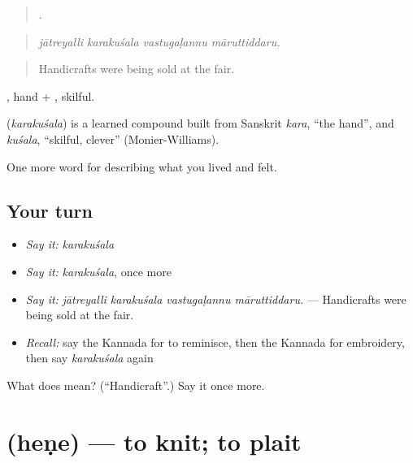 \begin{quote}
   .
\end{quote}

\begin{quote}
\emph{jātreyalli karakuśala vastugaḷannu māruttiddaru.}
\end{quote}

\begin{quote}
Handicrafts were being sold at the fair.
\end{quote}

, hand + , skilful.

\begin{cousinweb}
\textbf{} (\emph{karakuśala}) is a learned compound built from Sanskrit \emph{kara}, \textquotedblleft{}the hand\textquotedblright{}, and \emph{kuśala}, \textquotedblleft{}skilful, clever\textquotedblright{} (Monier-Williams).
\end{cousinweb}

\begin{grammarlens}[title={What you've built}]
One more word for describing what you lived and felt.
\end{grammarlens}

\subsection*{Your turn}
\begin{itemize}
\raggedright
  \item \emph{Say it:} \emph{karakuśala}
  \item \emph{Say it:} \emph{karakuśala}, once more
  \item \emph{Say it:} \emph{jātreyalli karakuśala vastugaḷannu māruttiddaru.} — Handicrafts were being sold at the fair.
  \item \emph{Recall:} say the Kannada for to reminisce, then the Kannada for embroidery, then say \emph{karakuśala} again
\end{itemize}

\begin{tcolorbox}[breakable,colback=teal!4,colframe=teal!35!black,title={Before you move on}]
What does  mean? (\textquotedblleft{}Handicraft\textquotedblright{}.) Say it once more.
\end{tcolorbox}
\section[\texorpdfstring{\kn{ಹೆಣೆ} (heṇe)}{ಹೆಣೆ (heṇe)}]{ (heṇe) — to knit; to plait}

